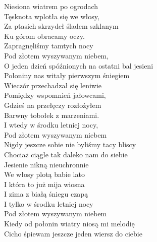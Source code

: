 \begin{text}
    Niesiona wiatrem po ogrodach\\
    Tęsknota wplotła się we włosy,\\
    Za ptasich skrzydeł śladem szklanym\\
    Ku górom obracamy oczy.\\
    Zapragnęliśmy tamtych nocy\\
    Pod złotem wyszywanym niebem,\\
    O jeden dzień spóźnionych na ostatni bal jesieni\\
    Połoniny nas witały pierwszym śniegiem\\
    Wieczór przechadzał się leniwie\\
    Pomiędzy wspomnień jałowcami,\\
    Gdzieś na przełęczy rozłożyłem\\
    Barwny tobołek z marzeniami.\\
    I wtedy w środku letniej nocy,\\
    Pod złotem wyszywanym niebem\\
    Nigdy jeszcze sobie nie byliśmy tacy bliscy\\
    Chociaż ciągle tak daleko nam do siebie\\
    Jesienie nikną nieuchronnie\\
    We włosy plotą babie lato\\
    I która to już mija wiosna\\
    I zima z białą śniegu czapą\\
    I tylko w środku letniej nocy\\
    Pod złotem wyszywanym niebem\\
    Kiedy od połonin wiatry niosą mi melodię\\
    Cicho śpiewam jeszcze jeden wiersz do ciebie
\end{text}
\begin{chord}

\end{chord}